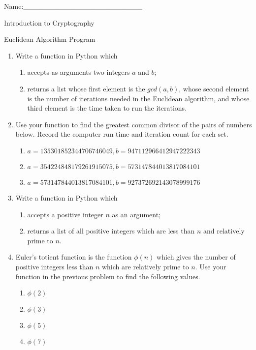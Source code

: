 \documentclass[12pt]{amsart}
\theoremstyle{definition}
\theoremstyle{remark}
\numberwithin{equation}{section}
\begin{document}
\begin{flushright}
Name:\_\_\_\_\_\_\_\_\_\_\_\_\_\_\_\_\_\_\_\_\_\_\_
\end{flushright}
\vspace{10pt}
\begin{center}
Introduction to Cryptography

Euclidean Algorithm Program
\end{center}


\begin{enumerate}
\item Write a function in Python which 
\begin{enumerate}
\item accepts as arguments two integers $a$ and $b$;
\item returns a list whose first element is the $gcd(a,b)$, whose second element is the number of iterations needed in the Euclidean algorithm, and whose third element is the time taken to run the iterations. 
\end{enumerate} 
\item Use your function to find the greatest common divisor of the pairs of numbers below. Record the computer run time and iteration count for each set.
\begin{enumerate}
\item $a=135301852344706746049, b=947112966412947222343$
\item $a=354224848179261915075, b=573147844013817084101$
\item $a=573147844013817084101, b=927372692143078999176$
\end{enumerate}
\item Write a function in Python which 
\begin{enumerate}
\item accepts a positive integer $n$ as an argument;
\item returns a list of all positive integers which are less than $n$ and relatively prime to $n$.
\end{enumerate}
\item Euler's totient function is the function $\phi(n)$ which gives the number of positive integers less than $n$ which are relatively prime to $n$. Use your function in the previous problem to find the following values.
\begin{enumerate}
\item $\phi(2)$
\item $\phi(3)$
\item $\phi(5)$
\item $\phi(7)$

\end{enumerate}
\end{enumerate}
\end{document}
